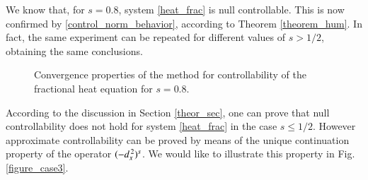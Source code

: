 We know that, for $s=0.8$, system \eqref{heat_frac} is null controllable. This is now confirmed by \eqref{control_norm_behavior}, according to Theorem \ref{theorem_hum}.  In fact, the same experiment can be repeated for different values of $s>1/2$, obtaining the same conclusions. 
\begin{figure}[h]
  \centering
{}
\caption{Convergence properties of the method for controllability of the fractional heat equation for $s=0.8$.}\label{figure_case1}
\end{figure}

According to the discussion in Section \ref{theor_sec}, one can prove that null controllability does not hold for system \eqref{heat_frac} in the case $s\leq 1/2$. However approximate controllability can be proved by means of the unique continuation property of the operator $(-d_x^{\,2})^{s}$. We would like to illustrate this property in Fig. \ref{figure_case3}.

